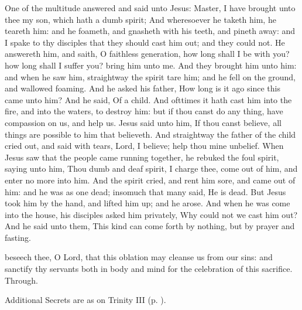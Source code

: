 \vspace{-1.5ex}
 One of the multitude answered and said unto Jesus: Master, I have brought unto thee my son, which hath a dumb spirit; And wheresoever he taketh him, he teareth him: and he foameth, and gnasheth with his teeth, and pineth away: and I spake to thy disciples that they should cast him out; and they could not. He answereth him, and saith, O faithless generation, how long shall I be with you? how long shall I suffer you? bring him unto me. And they brought him unto him: and when he saw him, straightway the spirit tare him; and he fell on the ground, and wallowed foaming. And he asked his father, How long is it ago since this came unto him? And he said, Of a child. And ofttimes it hath cast him into the fire, and into the waters, to destroy him: but if thou canst do any thing, have compassion on us, and help us. Jesus said unto him, If thou canst believe, all things are possible to him that believeth. And straightway the father of the child cried out, and said with tears, Lord, I believe; help thou mine unbelief. When Jesus saw that the people came running together, he rebuked the foul spirit, saying unto him, Thou dumb and deaf spirit, I charge thee, come out of him, and enter no more into him. And the spirit cried, and rent him sore, and came out of him: and he was as one dead; insomuch that many said, He is dead. But Jesus took him by the hand, and lifted him up; and he arose. And when he was come into the house, his disciples asked him privately, Why could not we cast him out? And he said unto them, This kind can come forth by nothing, but by prayer and fasting.

\vspace{-1.5ex}
\secret
{} beseech thee, O Lord, that this oblation may cleanse us from our sins: and sanctify thy servants both in body and mind for the celebration of this sacrifice. Through.
\begin{rubric}
    Additional Secrets are as on Trinity III (p. \pageref{TrinityIII}).
\end{rubric}

